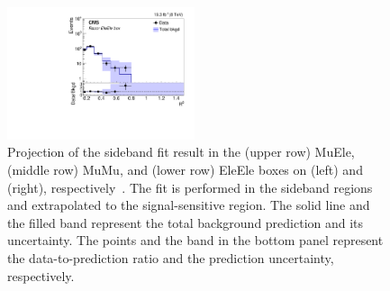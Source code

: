 \begin{figure}[tb!]
\includegraphics[width=0.49\textwidth]{figs/analysis8TeV/RSQ_ElectronHad-Run2012ABCD_Sideband_EleEle.pdf}
\caption{Projection of the sideband fit result in the (upper row) MuEle, (middle row)
  MuMu, and (lower row) EleEle boxes on \MR (left) and
   \Rtwo (right), respectively~\cite{razor8TeV,jmgd}. The fit is performed
  in the sideband regions and extrapolated to the signal-sensitive
  region. The solid line and the filled band represent the total
  background prediction and its uncertainty. The points and the band
  in the bottom panel represent the data-to-prediction ratio and the
  prediction uncertainty, respectively.\label{fig:Proj1DDilep}}
\end{figure}

